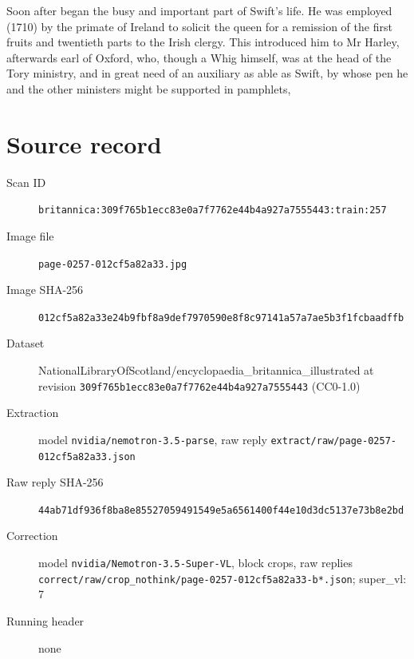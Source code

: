 \documentclass{article}
\begin{document}
Soon after began the busy and important part of Swift's life. He was employed (1710) by the primate of Ireland to solicit the queen for a remission of the first fruits and twentieth parts to the Irish clergy. This introduced him to Mr Harley, afterwards earl of Oxford, who, though a Whig himself, was at the head of the Tory ministry, and in great need of an auxiliary as able as Swift, by whose pen he and the other ministers might be supported in pamphlets,


\section*{Source record}
\begin{description}
\item[Scan ID] \texttt{britannica:309f765b1ecc83e0a7f7762e44b4a927a7555443:train:257}
\item[Image file] \texttt{page-0257-012cf5a82a33.jpg}
\item[Image SHA-256] \texttt{012cf5a82a33e24b9fbf8a9def7970590e8f8c97141a57a7ae5b3f1fcbaadffb}
\item[Dataset] NationalLibraryOfScotland/encyclopaedia\_britannica\_illustrated at revision \texttt{309f765b1ecc83e0a7f7762e44b4a927a7555443} (CC0-1.0)
\item[Extraction] model \texttt{nvidia/nemotron-3.5-parse}, raw reply \texttt{extract/raw/page-0257-012cf5a82a33.json}
\item[Raw reply SHA-256] \texttt{44ab71df936f8ba8e85527059491549e5a6561400f44e10d3dc5137e73b8e2bd}
\item[Correction] model \texttt{nvidia/Nemotron-3.5-Super-VL}, block crops, raw replies \texttt{correct/raw/crop\_nothink/page-0257-012cf5a82a33-b*.json}; super\_vl: 7
\item[Running header] none
\end{description}
\end{document}
